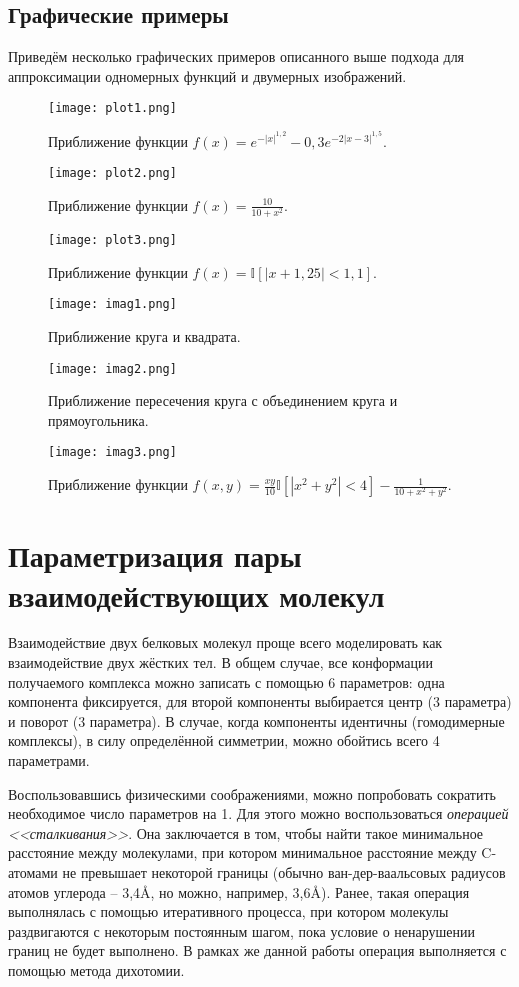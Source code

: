 \subsection{Графические примеры}
Приведём несколько графических примеров описанного выше подхода для аппроксимации одномерных функций и двумерных изображений.
\begin{figure}[H]
	\centering
	\texttt{[image: plot1.png]}
	\caption{Приближение функции $f(x) = e^{-|x|^{1,2}} - 0,3e^{-2|x-3|^{1,5}}$.}
	\label{fig_plot1}
\end{figure}
\begin{figure}[H]
	\centering
	\texttt{[image: plot2.png]}
	\caption{Приближение функции $f(x) = \frac{10}{10 + x^2}$.}
	\label{fig_plot2}
\end{figure}
\begin{figure}[H]
	\centering
	\texttt{[image: plot3.png]}
	\caption{Приближение функции $f(x) = \mathbb{I}[|x + 1,25| < 1,1]$.}
	\label{fig_plot3}
\end{figure}
\begin{figure}[H]
	\centering
	\texttt{[image: imag1.png]}
	\caption{Приближение круга и квадрата.}
	\label{fig_imag1}
\end{figure}
\begin{figure}[H]
	\centering
	\texttt{[image: imag2.png]}
	\caption{Приближение пересечения круга с объединением круга и прямоугольника.}
	\label{fig_imag2}
\end{figure}
\begin{figure}[H]
	\centering
	\texttt{[image: imag3.png]}
	\caption{Приближение функции $f(x, y) = \frac{xy}{10}\mathbb{I}[|x^2 + y^2| < 4] - \frac{1}{10 + x^2 + y^2}$.}
	\label{fig_imag3}
\end{figure}

\section{Параметризация пары взаимодействующих молекул}
Взаимодействие двух белковых молекул проще всего моделировать как взаимодействие двух жёстких тел. В общем случае, все конформации получаемого комплекса можно записать с помощью 6 параметров: одна компонента фиксируется, для второй компоненты выбирается центр (3 параметра) и поворот (3 параметра). В случае, когда компоненты идентичны (гомодимерные комплексы), в силу определённой симметрии, можно обойтись всего 4 параметрами.

Воспользовавшись физическими соображениями, можно попробовать сократить необходимое число параметров на 1. Для этого можно воспользоваться \textit{операцией <<сталкивания>>}\cite{prip2023}. Она заключается в том, чтобы найти такое минимальное расстояние между молекулами, при котором минимальное расстояние между C\textalpha-атомами не превышает некоторой границы (обычно ван-дер-ваальсовых радиусов атомов углерода -- 3,4\AA{}, но можно, например, 3,6\AA{}). Ранее, такая операция выполнялась с помощью итеративного процесса, при котором молекулы раздвигаются с некоторым постоянным шагом, пока условие о ненарушении границ не будет выполнено. В рамках же данной работы операция выполняется с помощью метода дихотомии.

